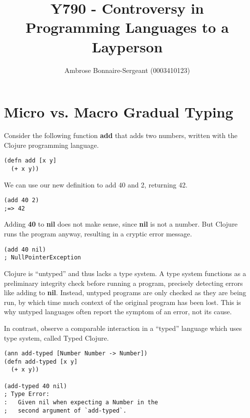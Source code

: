 \documentclass[10pt]{article}
\begin{document}
\title{Y790 - Controversy in Programming Languages to a Layperson}
\author{Ambrose Bonnaire-Sergeant (0003410123)}

\maketitle

\section{Micro vs. Macro Gradual Typing}

Consider the following function \textbf{add} that adds two numbers, written
with the Clojure programming language.

\begin{verbatim}
(defn add [x y]
  (+ x y))
\end{verbatim}

We can use our new definition to add 40 and 2, returning 42.

\begin{verbatim}
(add 40 2)
;=> 42
\end{verbatim}

Adding \textbf{40} to \textbf{nil} does not make sense, since \textbf{nil} is not a number.
But Clojure runs the program anyway, resulting in a cryptic error message.

\begin{verbatim}
(add 40 nil)
; NullPointerException
\end{verbatim}

Clojure is ``untyped'' and thus lacks a type system. A type system
functions as a preliminary integrity check before running a program, precisely
detecting errors like adding to \textbf{nil}.
Instead, untyped programs are only checked as they are being run,
by which time much context of the original program has been lost.
This is why untyped languages often report the symptom of an error,
not its cause.

In contrast, observe a comparable interaction in a ``typed'' language
which uses type system, called Typed Clojure.

\begin{verbatim}
(ann add-typed [Number Number -> Number])
(defn add-typed [x y]
  (+ x y))

(add-typed 40 nil)
; Type Error:
:   Given nil when expecting a Number in the
;   second argument of `add-typed`.
\end{verbatim}
\end{document}
